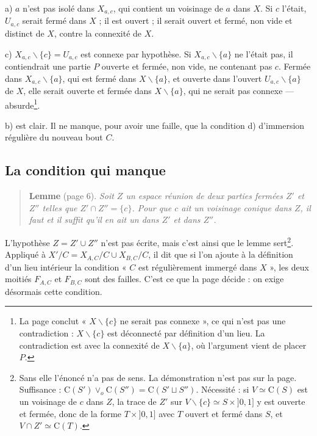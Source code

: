 \documentclass[11pt,a4paper]{article}
\begin{document}
a) $a$ n'est pas isolé dans $X_{a,c}$, qui contient un voisinage de $a$ dans $X$.
Si $c$ l'était, $U_{a,c}$ serait fermé dans $X$ ; il est ouvert ; il serait
ouvert et fermé, non vide et distinct de $X$, contre la connexité de $X$.

c) $X_{a,c} \smallsetminus \{c\} = U_{a,c}$ est connexe par hypothèse. Si
$X_{a,c} \smallsetminus \{a\}$ ne l'était pas, il contiendrait une partie $P$
ouverte et fermée, non vide, ne contenant pas $c$. Fermée dans
$X_{a,c} \smallsetminus \{a\}$, qui est fermé dans $X \smallsetminus \{a\}$, et
ouverte dans l'ouvert $U_{a,c} \smallsetminus \{a\}$ de $X$, elle serait ouverte
et fermée dans $X \smallsetminus \{a\}$, qui ne serait pas connexe ---
absurde\footnote{La page conclut « $X \smallsetminus \{c\}$ ne serait pas
connexe », ce qui n'est pas une contradiction : $X \smallsetminus \{c\}$ est
déconnecté par définition d'un lieu. La contradiction est avec la connexité de
$X \smallsetminus \{a\}$, où l'argument vient de placer $P$.}.

b) est clair. Il ne manque, pour avoir une faille, que la condition d)
d'immersion régulière du nouveau bout $C$.

\subsection*{La condition qui manque}

\begin{quote}
\textbf{Lemme} (page 6). \emph{Soit $Z$ un espace réunion de deux parties fermées
$Z'$ et $Z''$ telles que $Z' \cap Z'' = \{c\}$. Pour que $c$ ait un voisinage
conique dans $Z$, il faut et il suffit qu'il en ait un dans $Z'$ et dans $Z''$.}
\end{quote}

L'hypothèse $Z = Z' \cup Z''$ n'est pas écrite, mais c'est ainsi que le lemme
sert\footnote{Sans elle l'énoncé n'a pas de sens. La démonstration n'est pas sur
la page. Suffisance : $\mathrm{C}(S') \vee_{o} \mathrm{C}(S'') =
\mathrm{C}(S' \sqcup S'')$. Nécessité : si $V \simeq \mathrm{C}(S)$ est un
voisinage de $c$ dans $Z$, la trace de $Z'$ sur $V \smallsetminus \{c\} \simeq S
\times {]0,1]}$ y est ouverte et fermée, donc de la forme $T \times {]0,1]}$ avec
$T$ ouvert et fermé dans $S$, et $V \cap Z' \simeq \mathrm{C}(T)$.}. Appliqué à
$X' / C = X_{A,C}/C \cup X_{B,C}/C$, il dit que si l'on ajoute à la définition
d'un lieu intérieur la condition « $C$ est régulièrement immergé dans $X$ », les
deux moitiés $F_{A,C}$ et $F_{B,C}$ sont des failles. C'est ce que la page
décide : on exige désormais cette condition.
\end{document}
